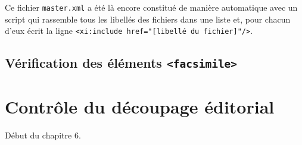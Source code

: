 Ce fichier \texttt{master.xml} a été là encore constitué de manière automatique avec un script qui rassemble tous les libellés des fichiers dans une liste et, pour chacun d'eux écrit la ligne \texttt{<xi:include href="[libellé du fichier]"/>}.

\section{Vérification des éléments \texttt{<facsimile>}}

\chapter{Contrôle du découpage éditorial}

Début du chapitre 6.